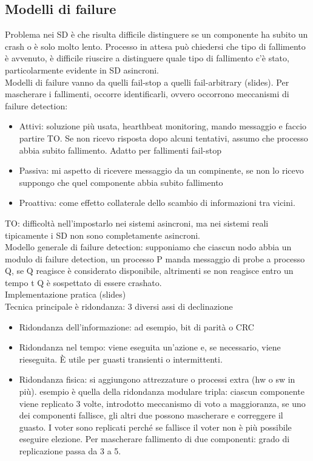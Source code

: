 \documentclass{article}
\begin{document}
\subsection{Modelli di failure}
Problema nei SD è che risulta difficile distinguere se un componente ha subito un crash o è solo molto lento. Processo in attesa può chiedersi che tipo di fallimento è avvenuto, è difficile riuscire a distinguere quale tipo di fallimento c'è stato, particolarmente evidente in SD asincroni.\\ Modelli di failure vanno da quelli fail-stop a quelli fail-arbitrary (slides). Per mascherare i fallimenti, occorre identificarli, ovvero occorrono meccanismi di failure detection:
\begin{itemize}
\item Attivi: soluzione più usata, hearthbeat monitoring, mando messaggio e faccio partire TO. Se non ricevo risposta dopo alcuni tentativi, assumo che processo abbia subito fallimento. Adatto per fallimenti fail-stop
\item Passiva: mi aspetto di ricevere messaggio da un compinente, se non lo ricevo suppongo che quel componente abbia subito fallimento
\item Proattiva: come effetto collaterale dello scambio di informazioni tra vicini.
\end{itemize}
TO: difficoltà nell'impostarlo nei sistemi asincroni, ma nei sistemi reali tipicamente i SD non sono completamente asincroni.\\ Modello generale di failure detection: supponiamo che ciascun nodo abbia un modulo di failure detection, un processo P manda messaggio di probe a processo Q, se Q reagisce è considerato disponibile, altrimenti se non reagisce entro un tempo t Q è sospettato di essere crashato.\\ Implementazione pratica (slides)\\ Tecnica principale è ridondanza: 3 diversi assi di declinazione
\begin{itemize}
\item Ridondanza dell'informazione: ad esempio, bit di parità o CRC
\item Ridondanza nel tempo: viene eseguita un'azione e, se necessario, viene rieseguita. È utile per guasti transienti o intermittenti.
\item Ridondanza fisica: si aggiungono attrezzature o processi extra (hw o sw in più). esempio è quella della ridondanza modulare tripla: ciascun componente viene replicato 3 volte, introdotto meccanismo di voto a maggioranza, se uno dei componenti fallisce, gli altri due possono mascherare e correggere il guasto. I voter sono replicati perché se fallisce il voter non è più possibile eseguire elezione. Per mascherare fallimento di due componenti: grado di replicazione passa da 3 a 5.
\end{itemize}
\end{document}
